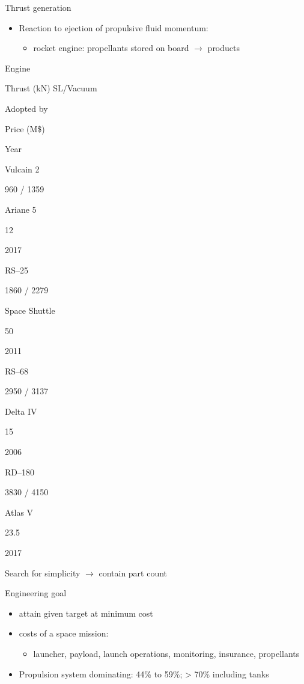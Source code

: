 \documentclass[
  ignorenonframetext,
]{beamer}
\providecommand{\tightlist}{%
  \setlength{\itemsep}{0pt}\setlength{\parskip}{0pt}}\usepackage{longtable,booktabs,array}
\begin{document}
\begin{frame}{Thrust generation}
\protect\hypertarget{thrust-generation}{}
\begin{itemize}
\tightlist
\item
  Reaction to ejection of propulsive fluid momentum:

  \begin{itemize}
  \tightlist
  \item
    rocket engine: propellants stored on board \(\rightarrow\) products
  \end{itemize}
\end{itemize}

Engine

Thrust (kN) SL/Vacuum

Adopted by

Price (M\$)

Year

Vulcain 2

960 / 1359

Ariane 5

12

2017

RS--25

1860 / 2279

Space Shuttle

50

2011

RS--68

2950 / 3137

Delta IV

15

2006

RD--180

3830 / 4150

Atlas V

23.5

2017

Search for simplicity \(\rightarrow\) contain part count
\end{frame}

\begin{frame}{Engineering goal}
\protect\hypertarget{engineering-goal}{}
\begin{itemize}
\tightlist
\item
  attain given target at minimum cost
\item
  costs of a space mission:

  \begin{itemize}
  \tightlist
  \item
    launcher, payload, launch operations, monitoring, insurance,
    propellants
  \end{itemize}
\end{itemize}

\begin{itemize}
\tightlist
\item
  Propulsion system dominating: 44\% to 59\%; \textgreater{} 70\%
  including tanks
\end{itemize}
\end{frame}
\end{document}
